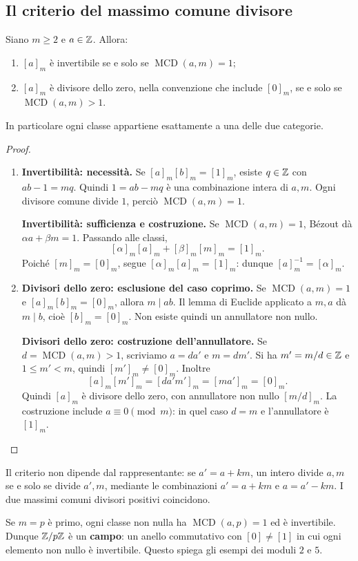 \subsection{Il criterio del massimo comune divisore}
\begin{teorema}\label{teo:unita-modulari}
Siano $m\ge2$ e $a\in\mathbb{Z}$. Allora:
\begin{enumerate}
\item $[a]_m$ è invertibile se e solo se $\operatorname{MCD}(a,m)=1$;
\item $[a]_m$ è divisore dello zero, nella convenzione che include $[0]_m$, se e solo se $\operatorname{MCD}(a,m)>1$.
\end{enumerate}
In particolare ogni classe appartiene esattamente a una delle due categorie.
\end{teorema}
\begin{proof}
\begin{enumerate}[label=\arabic*.]
\item \textbf{Invertibilità: necessità.} Se $[a]_m[b]_m=[1]_m$, esiste $q\in\mathbb{Z}$ con $ab-1=mq$. Quindi $1=ab-mq$ è una combinazione intera di $a,m$. Ogni divisore comune divide $1$, perciò $\operatorname{MCD}(a,m)=1$.

\textbf{Invertibilità: sufficienza e costruzione.} Se $\operatorname{MCD}(a,m)=1$, Bézout dà $\alpha a+\beta m=1$. Passando alle classi,
\[
[\alpha]_m[a]_m+[\beta]_m[m]_m=[1]_m.
\]
Poiché $[m]_m=[0]_m$, segue $[\alpha]_m[a]_m=[1]_m$: dunque $[a]_m^{-1}=[\alpha]_m$.
\item \textbf{Divisori dello zero: esclusione del caso coprimo.} Se $\operatorname{MCD}(a,m)=1$ e $[a]_m[b]_m=[0]_m$, allora $m\mid ab$. Il lemma di Euclide applicato a $m,a$ dà $m\mid b$, cioè $[b]_m=[0]_m$. Non esiste quindi un annullatore non nullo.

\textbf{Divisori dello zero: costruzione dell'annullatore.} Se $d=\operatorname{MCD}(a,m)>1$, scriviamo $a=da'$ e $m=dm'$. Si ha $m'=m/d\in\mathbb{Z}$ e $1\le m'<m$, quindi $[m']_m\ne[0]_m$. Inoltre
\[
[a]_m[m']_m=[da'm']_m=[ma']_m=[0]_m.
\]
Quindi $[a]_m$ è divisore dello zero, con annullatore non nullo $[m/d]_m$. La costruzione include $a\equiv0\pmod m$: in quel caso $d=m$ e l'annullatore è $[1]_m$.
\end{enumerate}
\end{proof}

\begin{osservazione}
Il criterio non dipende dal rappresentante: se $a'=a+km$, un intero divide $a,m$ se e solo se divide $a',m$, mediante le combinazioni $a'=a+km$ e $a=a'-km$. I due massimi comuni divisori positivi coincidono.

Se $m=p$ è primo, ogni classe non nulla ha $\operatorname{MCD}(a,p)=1$ ed è invertibile. Dunque $\mathbb{Z}/p\mathbb{Z}$ è un \textbf{campo}: un anello commutativo con $[0]\ne[1]$ in cui ogni elemento non nullo è invertibile. Questo spiega gli esempi dei moduli $2$ e $5$.
\end{osservazione}

